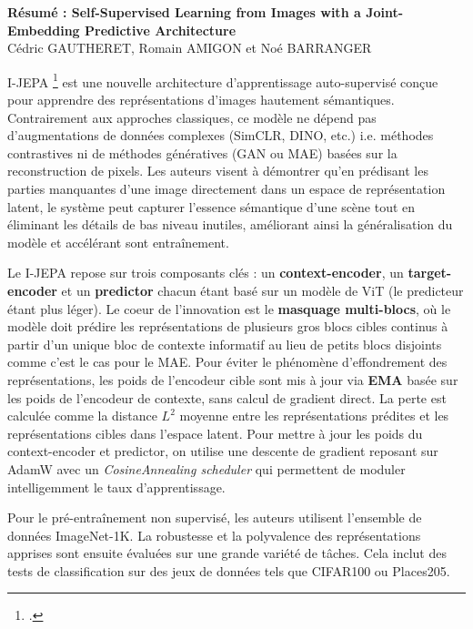 \documentclass[12pt, a4paper]{article}
\begin{document}
\pagestyle{empty}

\begin{center}
    \large \textbf{Résumé : Self-Supervised Learning from Images with a Joint-Embedding Predictive Architecture} \\
    \vspace{0.5cm}
    Cédric GAUTHERET, Romain AMIGON et Noé BARRANGER
\end{center}

I-JEPA \footcite{ijepa23} est une nouvelle architecture d'apprentissage auto-supervisé conçue pour apprendre des représentations d'images hautement sémantiques. Contrairement aux approches classiques, ce modèle ne dépend pas d'augmentations de données complexes (SimCLR, DINO, etc.) i.e. méthodes contrastives ni de méthodes génératives (GAN ou MAE) basées sur la reconstruction de pixels. Les auteurs visent à démontrer qu'en prédisant les parties manquantes d'une image directement dans un espace de représentation latent, le système peut capturer l'essence sémantique d'une scène tout en éliminant les détails de bas niveau inutiles, améliorant ainsi la généralisation du modèle et accélérant sont entraînement.

Le I-JEPA repose sur trois composants clés : un \textbf{context-encoder}, un \textbf{target-encoder} et un \textbf{predictor} chacun étant basé sur un modèle de ViT (le predicteur étant plus léger). Le coeur de l'innovation est le \textbf{masquage multi-blocs}, où le modèle doit prédire les représentations de plusieurs gros blocs cibles continus à partir d'un unique bloc de contexte informatif au lieu de petits blocs disjoints comme c'est le cas pour le MAE. Pour éviter le phénomène d'effondrement des représentations, les poids de l'encodeur cible sont mis à jour via \textbf{EMA} basée sur les poids de l'encodeur de contexte, sans calcul de gradient direct. La perte est calculée comme la distance $L^2$ moyenne entre les représentations prédites et les représentations cibles dans l'espace latent. Pour mettre à jour les poids du context-encoder et predictor, on utilise une descente de gradient reposant sur AdamW avec un \textit{CosineAnnealing scheduler} qui permettent de moduler intelligemment le taux d'apprentissage. 

Pour le pré-entraînement non supervisé, les auteurs utilisent l'ensemble de données ImageNet-1K. La robustesse et la polyvalence des représentations apprises sont ensuite évaluées sur une grande variété de tâches. Cela inclut des tests de classification sur des jeux de données tels que CIFAR100 ou Places205.
\end{document}

